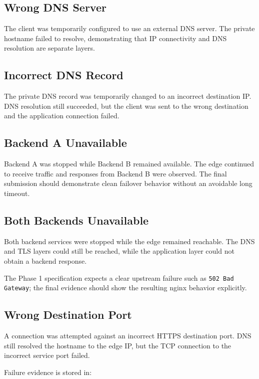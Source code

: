 \documentclass[11pt,a4paper]{article}
\begin{document}
\subsection{Wrong DNS Server}

The client was temporarily configured to use an external DNS server.
The private hostname failed to resolve, demonstrating that IP
connectivity and DNS resolution are separate layers.

\subsection{Incorrect DNS Record}

The private DNS record was temporarily changed to an incorrect
destination IP. DNS resolution still succeeded, but the client was sent
to the wrong destination and the application connection failed.

\subsection{Backend A Unavailable}

Backend A was stopped while Backend B remained available. The edge
continued to receive traffic and responses from Backend B were observed.
The final submission should demonstrate clean failover behavior without
an avoidable long timeout.

\subsection{Both Backends Unavailable}

Both backend services were stopped while the edge remained reachable.
The DNS and TLS layers could still be reached, while the application
layer could not obtain a backend response.

The Phase 1 specification expects a clear upstream failure such as
\texttt{502 Bad Gateway}; the final evidence should show the resulting
nginx behavior explicitly.

\subsection{Wrong Destination Port}

A connection was attempted against an incorrect HTTPS destination port.
DNS still resolved the hostname to the edge IP, but the TCP connection
to the incorrect service port failed.

Failure evidence is stored in:
\end{document}
